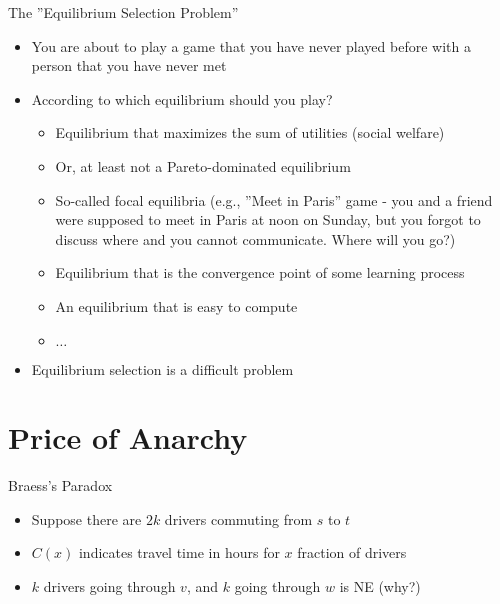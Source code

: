 \documentclass[11pt,aspectratio=169]{beamer}
\begin{document}
  \begin{frame}{The ''Equilibrium Selection Problem''}
  \begin{itemize}[<+->]
   \item You are about to play a game that you have never played before with a person that you have never met
   \item According to which equilibrium should you play?
   \begin{itemize}
    \item Equilibrium that maximizes the sum of utilities (\alert{social welfare})
    \item Or, at least not a \alert{Pareto-dominated} equilibrium
    \item So-called focal equilibria (e.g., ''Meet in Paris'' game - you and a friend were supposed to meet in Paris at noon on Sunday, but you forgot to discuss where and you cannot communicate. Where will you go?)
    \item Equilibrium that is the convergence point of some learning process
    \item An equilibrium that is easy to compute
    \item $\dots$
   \end{itemize}
   \item Equilibrium selection is a difficult problem
  \end{itemize}
  \end{frame}
  
 \section{Price of Anarchy}

  \begin{frame}{Braess's Paradox}
   \begin{center}
   \end{center}
   \begin{itemize}[<+->]
    \item Suppose there are $2k$ drivers commuting from $s$ to $t$
    \item $C(x)$ indicates travel time in hours for $x$ fraction of drivers 
    \item $k$ drivers going through $v$, and $k$ going through $w$ is NE (why?)
   \end{itemize}
  \end{frame}
  
\end{document}

